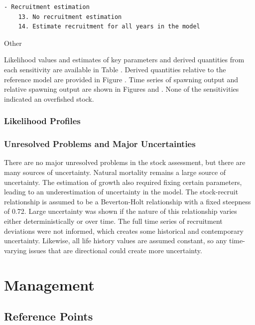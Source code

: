 \documentclass[
]{scrartcl}
\begin{document}
\begin{verbatim}
- Recruitment estimation
    13. No recruitment estimation
    14. Estimate recruitment for all years in the model
\end{verbatim}

Other

Likelihood values and estimates of key parameters and derived quantities
from each sensitivity are available in Table . Derived quantities
relative to the reference model are provided in Figure . Time series of
spawning output and relative spawning output are shown in Figures and .
None of the sensitivities indicated an overfished stock.

\subsubsection{Likelihood Profiles}\label{likelihood-profiles}

\subsubsection{Unresolved Problems and Major
Uncertainties}\label{unresolved-problems-and-major-uncertainties-1}

There are no major unresolved problems in the stock assessment, but
there are many sources of uncertainty. Natural mortality remains a large
source of uncertainty. The estimation of growth also required fixing
certain parameters, leading to an underestimation of uncertainty in the
model. The stock-recruit relationship is assumed to be a Beverton-Holt
relationship with a fixed steepness of 0.72. Large uncertainty was shown
if the nature of this relationship varies either deterministically or
over time. The full time series of recruitment deviations were not
informed, which creates some historical and contemporary uncertainty.
Likewise, all life history values are assumed constant, so any
time-varying issues that are directional could create more uncertainty.

\newpage{}

\section{Management}\label{management}

\subsection{Reference Points}\label{reference-points-1}
\end{document}
